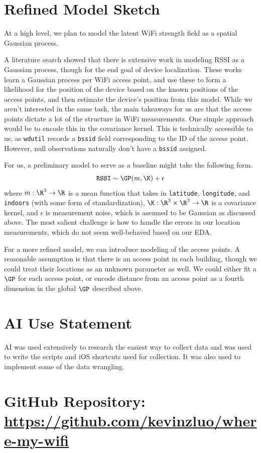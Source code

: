 \documentclass{article}
\begin{document}
\section{Refined Model Sketch}

At a high level, we plan to model the latent WiFi strength field as a spatial Gaussian process. 

A literature search showed that there is extensive work in modeling RSSI \cite{ferris_gaussian_2006, kumar_gaussian_2016} as a Gaussian process, though for the end goal of device localization. These works learn a Gaussian process per WiFi access point, and use these to form a likelihood for the position of the device based on the known positions of the access points, and then estimate the device's position from this model. While we aren't interested in the same task, the main takeaways for us are that the access points dictate a lot of the structure in WiFi measurements. One simple approach would be to encode this in the covariance kernel. This is technically accessible to us, as \verb|wdutil| records a \verb|bssid| field corresponding to the ID of the access point. However, null observations naturally don't have a \verb|bssid| assigned.

For us, a preliminary model to serve as a baseline might take the following form.
\[
    \texttt{RSSI} \sim \GP(m, \K) + \epsilon
\]
where $m: \R^3 \to \R$ is a mean function that takes in \texttt{latitude}, \texttt{longitude}, and \texttt{indoors} (with some form of standardization), $\K: \R^3 \times \R^3 \to \R$ is a covariance kernel, and $\epsilon$ is measurement noise, which is assumed to be Gaussian as discussed above. The most salient challenge is how to handle the errors in our location measurements, which do not seem well-behaved based on our EDA.

For a more refined model, we can introduce modeling of the access points. A reasonable assumption is that there is an access point in each building, though we could treat their locations as an unknown parameter as well. We could either fit a $\GP$ for each access point, or encode distance from an access point as a fourth dimension in the global $\GP$ described above.

\newpage




\section*{AI Use Statement}

AI was used extensively to research the easiest way to collect data and was used to write the scripts and iOS shortcuts used for collection. It was also used to implement some of the data wrangling. 

\section*{GitHub Repository: \url{https://github.com/kevinzluo/where-my-wifi}}
\end{document}
